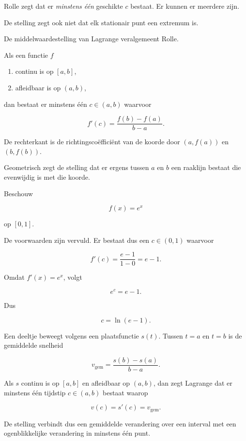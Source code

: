 \documentclass{ximera}
\begin{document}
\begin{opmerking}
Rolle zegt dat er \emph{minstens één} geschikte \(c\) bestaat.
Er kunnen er meerdere zijn.

De stelling zegt ook niet dat elk stationair punt een extremum is.
\end{opmerking}



De middelwaardestelling van Lagrange veralgemeent Rolle.

\begin{eigenschap}
Als een functie \(f\)

\begin{enumerate}
  \item continu is op \([a,b]\),
  \item afleidbaar is op \((a,b)\),
\end{enumerate}

dan bestaat er minstens één \(c\in(a,b)\) waarvoor

\[
\boxed{f'(c)=\frac{f(b)-f(a)}{b-a}.}
\]

De rechterkant is de richtingscoëfficiënt van de koorde door
\((a,f(a))\) en \((b,f(b))\).
\end{eigenschap}

Geometrisch zegt de stelling dat er ergens tussen \(a\) en \(b\) een
raaklijn bestaat die evenwijdig is met die koorde.

\begin{voorbeeld}
Beschouw

\[f(x)=e^x\]

op \([0,1]\).

De voorwaarden zijn vervuld. Er bestaat dus een \(c\in(0,1)\) waarvoor

\[
f'(c)=\frac{e-1}{1-0}=e-1.
\]

Omdat \(f'(x)=e^x\), volgt

\[e^c=e-1.\]

Dus

\[\boxed{c=\ln(e-1).}\]
\end{voorbeeld}

\begin{voorbeeld}
Een deeltje beweegt volgens een plaatsfunctie \(s(t)\). Tussen
\(t=a\) en \(t=b\) is de gemiddelde snelheid

\[
v_{\mathrm{gem}}
=
\frac{s(b)-s(a)}{b-a}.
\]

Als \(s\) continu is op \([a,b]\) en afleidbaar op \((a,b)\), dan zegt
Lagrange dat er minstens één tijdstip \(c\in(a,b)\) bestaat waarop

\[
v(c)=s'(c)=v_{\mathrm{gem}}.
\]

De stelling verbindt dus een gemiddelde verandering over een interval
met een ogenblikkelijke verandering in minstens één punt.
\end{voorbeeld}
\end{document}
